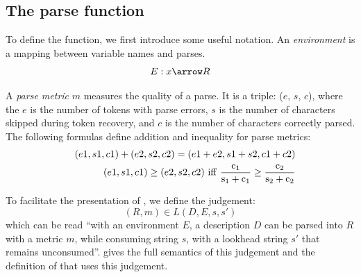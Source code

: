 \subsection{The parse function}
\label{sec:parse}
To define the  function, we first introduce some useful notation.
An {\em environment} is a mapping between variable names and parses.
\[E : x \arrow R \]

A {\em parse metric} $m$ measures the quality of a parse. It is a 
triple: ($e$, $s$, $c$), where the $e$ is the number of tokens
with parse errors, $s$ is the number of 
characters skipped during  token recovery, 
and $c$ is the number of characters correctly parsed. 
The following formulas define addition and inequality for parse metrics:
\begin{eqnarray}
&&(e1, s1, c1) + (e2, s2, c2) = (e1 + e2, s1 + s2, c1 + c2)  \\ 
&&(e1, s1, c1) \ge (  e2, s2, c2)~ \rm{iff}~ \frac{c_1}{s_1+c_1} 
\ge \frac{c_2}{s_2 + c_2} \label{eqn:metric-eqn}
\end{eqnarray}

To facilitate the presentation of , we define the judgement:
\[(R, m) \in L(D, E, s, s')\]
which can be read ``with an environment $E$, a description $D$
can be parsed into $R$ with a metric $m$, while consuming
string $s$, with a lookhead string $s'$ that remains unconsumed''.
 gives the full semantics of this judgement and
the definition of  that uses this judgement.


